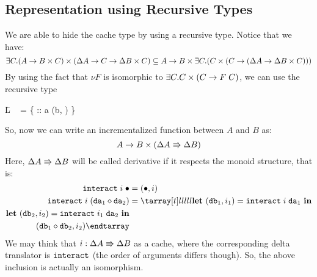 \documentclass{article}
\theoremstyle{definition}
\begin{document}

\subsection{Representation using Recursive Types}

We are able to hide the cache type by using a recursive type.
Notice that we have:
\[
  \exists C. (A \to B \times C) \times (\Delta A \to C \to \Delta B \times C)
  \subseteq 
   A \to B \times \exists C. (C \times (C \to (\Delta A \to \Delta B \times C)))
\]
By using the fact that $\nu F$ is isomorphic to $\exists C. C \times (C \to F \; C)$, we can use the recursive type 
\begin{code}
\=L ~ = \A \{  :: a \to (b, ) \}
\end{code}
So, now we can write an incrementalized function between $A$ and $B$ as: 
\[
  A \to B \times (\Delta A \Rrightarrow \Delta B)
\]
Here, $\Delta A \Rrightarrow \Delta B$ will be called derivative if it respects the monoid structure, that is: 
\begin{align*}
 \var{interact} \A i \A \NilChange &= (\NilChange, i) \\
 \var{interact} \A i \A (\var{da}_1 \ComposeU \var{da}_2) &= 
  \bbt \LET~(\var{db}_1,i_1) = \var{interact} \A i \A \var{da}_1~\IN\\
       \LET~(\var{db}_2,i_2) = \var{interact} \A i_1 \A \var{da}_2~\IN\\
       \quad (\var{db}_1 \ComposeU \var{db}_2, i_2) 
  \ee  
\end{align*}
We may think that $i : \Delta A \Rrightarrow \Delta B$ as a cache, where the corresponding delta translator is $\texttt{interact}$ (the order of arguments differs though). 
So, the above inclusion is actually an isomorphism. 
\end{document}
